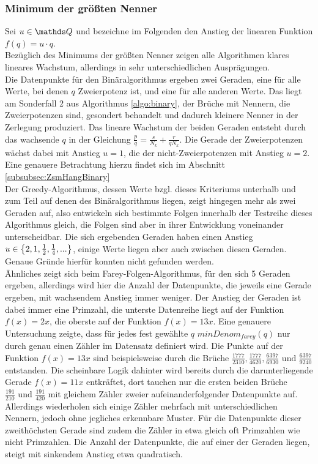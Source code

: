 \subsubsection{Minimum der größten Nenner}
Sei $u \in \Q$ und bezeichne im Folgenden den Anstieg der linearen Funktion $f(q)=u \cdot q$.\\
Bezüglich des Minimums der größten Nenner zeigen alle Algorithmen klares lineares Wachstum, allerdings in sehr unterschiedlichen Ausprägungen.\\ 
Die Datenpunkte für den Binäralgorithmus ergeben zwei Geraden, eine für alle Werte, bei denen $q$ Zweierpotenz ist, und eine für alle anderen Werte. Das liegt am Sonderfall 2 aus Algorithmus \ref{algo:binary}, der Brüche mit Nennern, die Zweierpotenzen sind, gesondert behandelt und dadurch kleinere Nenner in der Zerlegung produziert. Das lineare Wachstum der beiden Geraden entsteht durch das wachsende $q$ in der Gleichung $\frac{p}{q} = \frac{s}{N_k} + \frac{r}{qN_k}$. Die Gerade der Zweierpotenzen wächst dabei mit Anstieg $u = 1$, die der nicht-Zweierpotenzen mit Anstieg $u=2$. Eine genauere Betrachtung hierzu findet sich im Abschnitt \ref{subsubsec:ZsmHangBinary}\\
Der Greedy-Algorithmus, dessen Werte bzgl. dieses Kriteriums unterhalb und zum Teil auf denen des Binäralgorithmus liegen, zeigt hingegen mehr als zwei Geraden auf, also entwickeln sich bestimmte Folgen innerhalb der Testreihe dieses Algorithmus gleich, die Folgen sind aber in ihrer Entwicklung voneinander unterscheidbar. Die sich ergebenden Geraden haben einen Anstieg $u \in \left\{ 2, 1, \frac{1}{2}, \frac{1}{4}, ... \right\}$, einige Werte liegen aber auch zwischen diesen Geraden. Genaue Gründe hierfür konnten nicht gefunden werden.\\
Ähnliches zeigt sich beim Farey-Folgen-Algorithmus, für den sich 5 Geraden ergeben, allerdings wird hier die Anzahl der Datenpunkte, die jeweils eine Gerade ergeben, mit wachsendem Anstieg immer weniger. Der Anstieg der Geraden ist dabei immer eine Primzahl, die unterste Datenreihe liegt auf der Funktion $f(x)=2x$, die oberste auf der Funktion $f(x) = 13x$. Eine genauere Untersuchung zeigte, dass für jedes fest gewählte $q$ $minDenom_{farey}(q)$ nur durch genau einen Zähler im Datensatz definiert wird. Die Punkte auf der Funktion $f(x) = 13x$ sind beispielsweise durch die Brüche $\frac{1777}{2310}, \frac{1777}{4620}, \frac{6397}{6930} \text{ und } \frac{6397}{9240}$ entstanden. Die scheinbare Logik dahinter wird bereits durch die darunterliegende Gerade $f(x)=11x$ entkräftet, dort tauchen nur die ersten beiden Brüche $\frac{191}{210} \text{ und } \frac{191}{420}$ mit gleichem Zähler zweier aufeinanderfolgender Datenpunkte auf. Allerdings wiederholen sich einige Zähler mehrfach mit unterschiedlichen Nennern, jedoch ohne jegliches erkennbare Muster. Für die Datenpunkte dieser zweithöchsten Gerade sind zudem die Zähler in etwa gleich oft Primzahlen wie nicht Primzahlen. Die Anzahl der Datenpunkte, die auf einer der Geraden liegen, steigt mit sinkendem Anstieg etwa quadratisch.

